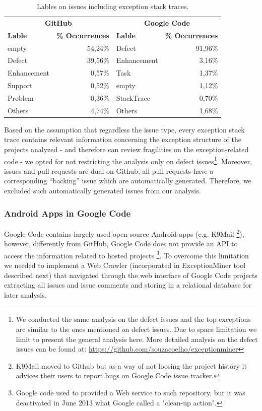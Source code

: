 \documentclass[conference]{IEEEtran}
\begin{document}
\begin{table}
  \centering
  \begin{tabular}{lr|lr}
    \hline
     \multicolumn{2}{c}{\bfseries{GitHub}} &  \multicolumn{2}{c}{\bfseries{Google Code}} \\
      \bfseries{Lable} &  \bfseries{\% Occurrences} &  \bfseries{Lable} &  \bfseries{\% Occurrences} \\
    \hline
empty &	54,24\% & Defect &	91,96\% \\
Defect &	39,56\%  & Enhancement  &	3,16\% \\
Enhancement &	0,57\% & Task	& 1,37\% \\
Support &	0,52\% & empty &	1,12\% \\
Problem &	0,36\% & StackTrace &	0,70\% \\
Others &	4,74\% &  Others &	1,68\% \\   
  \hline
  \end{tabular}
  \caption{Lables on issues including exception stack traces.}
  \label{tab:lables}
\end{table}

Based on the assumption that regardless the issue type, every exception stack
trace contains relevant information concerning the exception structure of the
projects analyzed - and therefore can review fragilities on the exception-related code -  
we opted for not restricting the analysis only on defect
issues\footnote{We conducted the same analysis on the defect issues and the top
exceptions are similar to the ones mentioned on defect issues. Due to space
limitation we limit to present the general analysis here. More detailed analysis
on the defect issues can be found at:
\url{https://github.com/souzacoelho/exceptionminer}}.
 Moreover, issues and pull requests are dual on Github; all pull requests have a corresponding 
``backing'' issue which are automatically generated. Therefore, we excluded such automatically generated
issues from our analysis. 

\subsubsection{Android Apps in Google Code}
Google Code contains largely used open-source Android apps (e.g. K9Mail \footnote{K9Mail moved to Github but as a way of not loosing the project history 
it advices their users to report bugs on Google Code issue tracker.}), however, differently from GitHub, Google Code does not provide an API to access the information related
 to hosted projects \footnote{Google code used to provided a Web service to such repository, but it was deactivated in June 2013 what Google called a "clean-up action".}.
To overcome this limitation we needed to implement a Web Crawler (incorporated in ExceptionMiner tool described next) that navigated 
through the web interface of Google Code projects extracting all issues and issue comments and storing in a relational database for later analysis.
\end{document}
